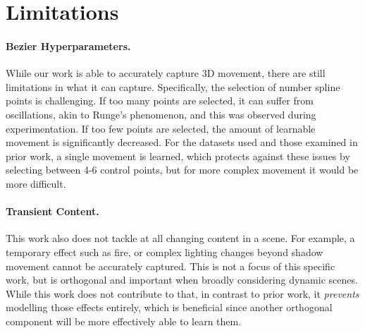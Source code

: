 \section{Limitations}

\paragraph{Bezier Hyperparameters.} While our work is able to accurately capture 3D movement, there are still limitations in what it can capture. Specifically, the selection of number spline points is challenging. If too many points are selected, it can suffer from oscillations, akin to Runge's phenomenon, and this was observed during experimentation. If too few points are selected, the amount of learnable movement is significantly decreased. For the datasets used and those examined in prior work, a single movement is learned, which protects against these issues by selecting between 4-6 control points, but for more complex movement it would be more difficult.

\paragraph{Transient Content.} This work also does not tackle at all changing content in a scene. For example, a temporary effect such as fire, or complex lighting changes beyond shadow movement cannot be accurately captured. This is not a focus of this specific work, but is orthogonal and important when broadly considering dynamic scenes. While this work does not contribute to that, in contrast to prior work, it \textit{prevents} modelling those effects entirely, which is beneficial since another orthogonal component will be more effectively able to learn them.

